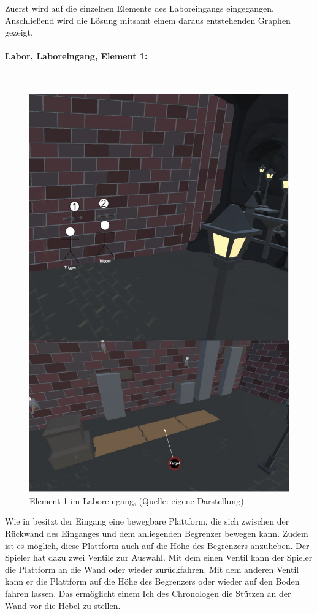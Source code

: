 Zuerst wird auf die einzelnen Elemente des Laboreingangs eingegangen. Anschließend wird die Lösung mitsamt einem daraus entstehenden Graphen gezeigt.

\paragraph{Labor, Laboreingang, Element 1:}\label{p:lle1}
~
\begin{figure}[ht]
\centering
\includegraphics[width=0.8\linewidth]{content/pictures/Raetsel-L02_R02_R01.jpg}
\caption{Element 1 im Laboreingang, (Quelle: eigene Darstellung)}
\label{fig:L02_R02_R01}
\end{figure}

Wie in  besitzt der Eingang eine bewegbare Plattform, die sich zwischen der Rückwand des Einganges und dem anliegenden Begrenzer bewegen kann. Zudem ist es möglich, diese Plattform auch auf die Höhe des Begrenzers anzuheben. Der Spieler hat dazu zwei Ventile zur Auswahl. Mit dem einen Ventil kann der Spieler die Plattform an die Wand oder wieder zurückfahren. Mit dem anderen Ventil kann er die Plattform auf die Höhe des Begrenzers oder wieder auf den Boden fahren lassen. Das ermöglicht einem  Ich des Chronologen die Stützen an der Wand vor die Hebel zu stellen.

